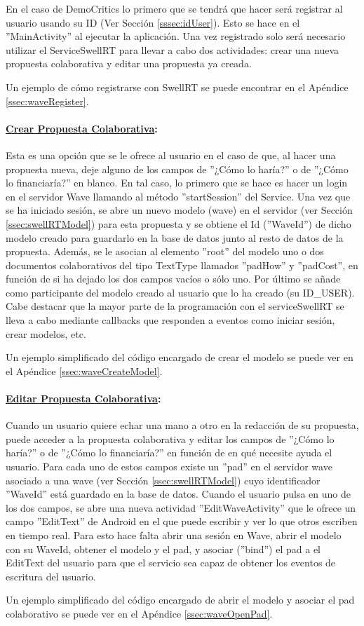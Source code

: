 		En el caso de DemoCritics lo primero que se tendrá que hacer será registrar al usuario usando su ID (Ver Sección \ref{sssec:idUser}). Esto se hace en el ''MainActivity'' al ejecutar la aplicación.  Una vez registrado solo será necesario utilizar el ServiceSwellRT para llevar a cabo dos actividades: crear una nueva propuesta colaborativa y editar una propuesta ya creada. 
		
		Un ejemplo de cómo registrarse con SwellRT se puede encontrar en el Apéndice \ref{ssec:waveRegister}. \\

		\paragraph{\underline{Crear Propuesta Colaborativa}:}
		
		Esta es una opción que se le ofrece al usuario en el caso de que, al hacer una propuesta nueva, deje alguno de los campos de ''¿Cómo lo haría?'' o de ''¿Cómo lo financiaría?'' en blanco. En tal caso, lo primero que se hace es hacer un login en el servidor Wave llamando al método ''startSession'' del Service. Una vez que se ha iniciado sesión, se abre un nuevo modelo  (wave) en el servidor (ver Sección \ref{ssec:swellRTModel}) para esta propuesta y se obtiene el Id (''WaveId'') de dicho modelo creado para guardarlo en la base de datos junto al resto de datos de la propuesta. Además, se le asocian al elemento ''root'' del modelo uno o dos documentos colaborativos del tipo TextType llamados ''padHow'' y ''padCost'', en función de si ha dejado los dos campos vacíos o sólo uno. Por último se añade como participante del modelo creado al usuario que lo ha creado (su ID\_USER). Cabe destacar que la mayor parte de la programación con el serviceSwellRT se lleva a cabo mediante callbacks que responden a eventos como iniciar sesión, crear modelos, etc.
		
		Un ejemplo simplificado del código encargado de crear el modelo se puede ver en el Apéndice \ref{ssec:waveCreateModel}.\\
		
			
		\paragraph{\underline{Editar Propuesta Colaborativa}:}

		Cuando un usuario quiere echar una mano a otro en la redacción de su propuesta, puede acceder a la propuesta colaborativa y editar los campos de ''¿Cómo lo haría?'' o de ''¿Cómo lo financiaría?'' en función de en qué necesite ayuda el usuario. Para cada uno de estos campos existe un ''pad'' en el servidor wave asociado a una wave (ver Sección \ref{ssec:swellRTModel}) cuyo identificador ''WaveId'' está guardado en la base de datos. Cuando el usuario pulsa en uno de los dos campos, se abre una nueva actividad ''EditWaveActivity'' que le ofrece un campo ''EditText'' de Android en el que puede escribir y ver lo que otros escriben en tiempo real. Para esto hace falta abrir una sesión en Wave, abrir el modelo con su WaveId, obtener el modelo y el pad, y asociar (''bind'') el pad a el EditText del usuario para que el servicio sea capaz de obtener los eventos de escritura del usuario.
		
		Un ejemplo simplificado del código encargado de abrir el modelo y asociar el pad colaborativo se puede ver en el Apéndice \ref{ssec:waveOpenPad}.
		
		

